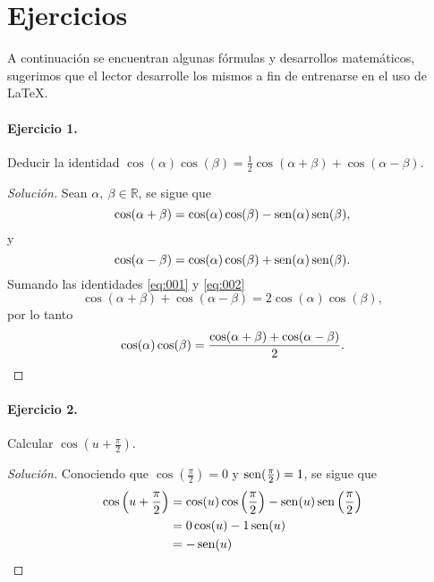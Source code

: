 \documentclass[a4,10pt]{aleph-notas}
\theoremstyle{definition}
\theoremstyle{plain}
\begin{document}
\section{Ejercicios}

A continuación se encuentran algunas fórmulas y desarrollos matemáticos, sugerimos que el lector desarrolle los mismos a fin de entrenarse en el uso de \LaTeX{}.

\paragraph{Ejercicio 1.} Deducir la identidad $\cos(\alpha)\cos(\beta)=\frac 1 2 {\cos(\alpha+\beta)+\cos(\alpha-\beta)}$.

\begin{proof}[Solución]
    Sean $\alpha,\ \beta\in\mathbb{R}$, se sigue que
    \begin{equation}\label{eq:001}
        \cos(\alpha+\beta)=\cos(\alpha)\cos(\beta)-\mathop{\rm sen}(\alpha)\mathop{\rm sen}(\beta),
    \end{equation}
    y
    \begin{equation}\label{eq:002}
        \cos(\alpha-\beta)=\cos(\alpha)\cos(\beta)+\mathop{\rm sen}(\alpha)\mathop{\rm sen}(\beta).
    \end{equation}
    Sumando las identidades \eqref{eq:001} y \eqref{eq:002}
    \begin{equation*}
      \cos(\alpha+\beta)+\cos(\alpha-\beta)=2\cos(\alpha)\cos(\beta),
    \end{equation*}
    por lo tanto
    \begin{equation*}
      \cos(\alpha)\cos(\beta)=\frac {\cos(\alpha+\beta)+\cos(\alpha-\beta)} 2.\qedhere
    \end{equation*}
\end{proof}

\paragraph{Ejercicio 2.} Calcular $\cos(u+\frac \pi 2)$.
\begin{proof}[Solución]
Conociendo que $\cos(\frac \pi 2)=0$ y $\mathop{\rm sen}(\frac \pi 2)=1$, se sigue que
\begin{align*}
 \cos\left(u+\frac \pi 2\right)&=\cos(u)\cos\left(\frac \pi 2\right)-\mathop{\rm sen}(u)\mathop{\rm sen}\left(\frac \pi 2\right)\\
    &=0\cos(u)-1\mathop{\rm sen}(u)\\
    &=-\mathop{\rm sen}(u)\qedhere
\end{align*}

\end{proof}
\end{document}
